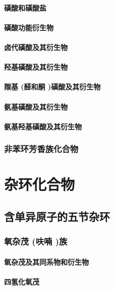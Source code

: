 \documentclass[UTF8]{../03-Chemistry}
\begin{document}
        \subsubsection{磺酸和磺酸盐}
        \subsubsection{磺酸功能衍生物}
        \subsubsection{卤代磺酸及其衍生物}
        \subsubsection{羟基磺酸及其衍生物}
        \subsubsection{羰基 (醛和酮 )磺酸及其衍生物}
        \subsubsection{氨基磺酸及其衍生物}
        \subsubsection{氨基羟基磺酸及其衍生物}
    \subsection{非苯环芳香族化合物}







\chapter{杂环化合物}
\section{含单异原子的五节杂环}
    \subsection{氧杂茂 (呋喃 )族}
        \subsubsection{氧杂茂及其同系物和衍生物}
        \subsubsection{四氢化氧茂}
\end{document}
